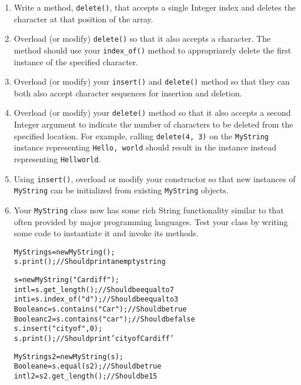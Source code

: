 \documentclass[11pt,a4paper]{report}
\begin{document}
\begin{enumerate}
    \item Write a method, \texttt{delete()}, that accepts a single Integer index and deletes the character at that position of the array. 

    \item Overload (or modify) \texttt{delete()} so that it also accepts a character. The method should use your \texttt{index\_of()} method to appropriarely delete the first instance of the specified character.

    \item Overload (or modify) your \texttt{insert()} and \texttt{delete()} method so that they can both also accept character sequences for insertion and deletion.

    \item Overload (or modify) your \texttt{delete()} method so that it also accepts a second Integer argument to indicate the number of characters to be deleted from the specified location. For example, calling \texttt{delete(4, 3)} on the \texttt{MyString} instance representing \texttt{Hello, world} should result in the instance instead representing \texttt{Hellworld}.

    \item Using \texttt{insert()}, overload or modify your constructor so that new instances of \texttt{MyString} can be initialized from existing \texttt{MyString} objects.

    \item Your \texttt{MyString} class now has some rich String functionality similar to that often provided by major programming languages. Test your class by writing some code to instantiate it and invoke its methods.

\begin{alltt}
MyString s = new MyString();
s.print(); // Should print an empty string

s = new MyString("Cardiff");
int l = s.get_length(); // Should be equal to 7
int i = s.index_of("d"); // Should be equal to 3
Boolean c = s.contains("Car"); // Should be true
Boolean c2 = s.contains("car"); // Should be false
s.insert("city of ", 0);
s.print(); // Should print 'city of Cardiff'

MyString s2 = new MyString(s);
Boolean e = s.equal(s2); // Should be true
int l2 = s2.get_length(); // Should be 15
\end{alltt}
\end{enumerate}
\end{document}
